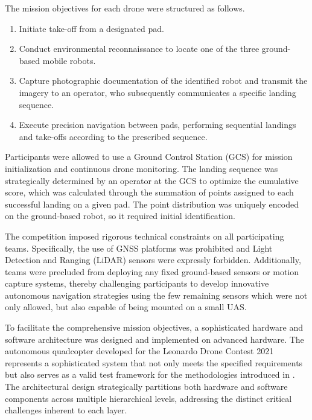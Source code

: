 The mission objectives for each drone were structured as follows.
\begin{enumerate}
  \item Initiate take-off from a designated pad.
  \item Conduct environmental reconnaissance to locate one of the three ground-based mobile robots.
  \item Capture photographic documentation of the identified robot and transmit the imagery to an operator, who subsequently communicates a specific landing sequence.
  \item Execute precision navigation between pads, performing sequential landings and take-offs according to the prescribed sequence.
\end{enumerate}

Participants were allowed to use a Ground Control Station (GCS) for mission initialization and continuous drone monitoring. The landing sequence was strategically determined by an operator at the GCS to optimize the cumulative score, which was calculated through the summation of points assigned to each successful landing on a given pad. The point distribution was uniquely encoded on the ground-based robot, so it required initial identification.

The competition imposed rigorous technical constraints on all participating teams. Specifically, the use of GNSS platforms was prohibited and Light Detection and Ranging (LiDAR) sensors were expressly forbidden. Additionally, teams were precluded from deploying any fixed ground-based sensors or motion capture systems, thereby challenging participants to develop innovative autonomous navigation strategies using the few remaining sensors which were not only allowed, but also capable of being mounted on a small UAS.

To facilitate the comprehensive mission objectives, a sophisticated hardware and software architecture was designed and implemented on advanced hardware. The autonomous quadcopter developed for the Leonardo Drone Contest 2021 represents a sophisticated system that not only meets the specified requirements but also serves as a valid test framework for the methodologies introduced in . The architectural design strategically partitions both hardware and software components across multiple hierarchical levels, addressing the distinct critical challenges inherent to each layer.

